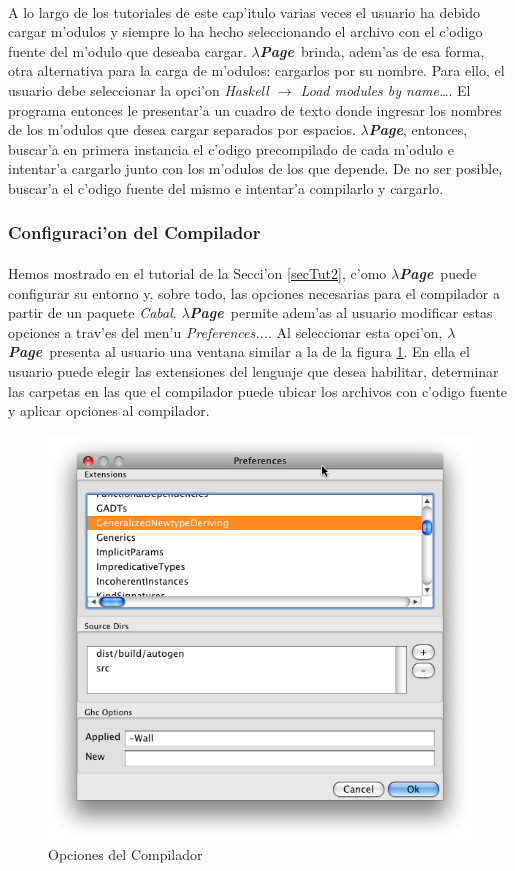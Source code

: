 \documentclass[a4paper]{article}
\newcommand{\hpage}{\textbf{\textsl{$\lambda$Page}}}
\newcommand{\cabal}{\textsl{Cabal}}
\begin{document}
\paragraph{}A lo largo de los tutoriales de este cap'itulo varias veces el usuario ha debido cargar m'odulos y siempre lo ha hecho seleccionando el archivo con el c'odigo fuente del m'odulo que deseaba cargar.  \hpage\ brinda, adem'as de esa forma, otra alternativa para la carga de m'odulos: cargarlos por su nombre.  Para ello, el usuario debe seleccionar la opci'on \textsl{Haskell $\rightarrow$ Load modules by name\ldots}.  El programa entonces le presentar'a un cuadro de texto donde ingresar los nombres de los m'odulos que desea cargar separados por espacios.  \hpage, entonces, buscar'a en primera instancia el c'odigo precompilado de cada m'odulo e intentar'a cargarlo junto con los m'odulos de los que depende.  De no ser posible, buscar'a el c'odigo fuente del mismo e intentar'a compilarlo y cargarlo.
\subsubsection{Configuraci'on del Compilador}
\paragraph{}Hemos mostrado en el tutorial de la Secci'on \ref{secTut2}, c'omo \hpage\ puede configurar su entorno y, sobre todo, las opciones necesarias para el compilador a partir de un paquete \cabal.  \hpage\ permite adem'as al usuario modificar estas opciones a trav'es del men'u \textsl{Preferences...}.  Al seleccionar esta opci'on, \hpage\ presenta al usuario una ventana similar a la de la figura \ref{etc7}.  En ella el usuario puede elegir las extensiones del lenguaje que desea habilitar, determinar las carpetas en las que el compilador puede ubicar los archivos con c'odigo fuente y aplicar opciones al compilador.
\begin{figure}[hp]
	\begin{center}
        	\includegraphics[width=.75\textwidth]{pictures/prefs}
		\caption{Opciones del Compilador}
		\label{etc7}
	\end{center}
\end{figure}
\end{document}
